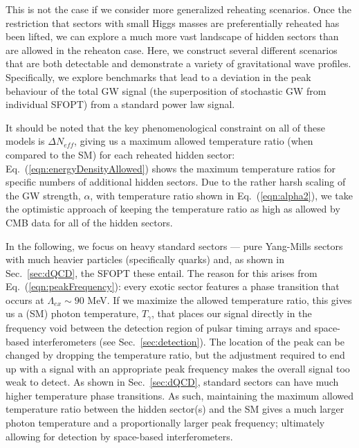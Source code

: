 \documentclass[nofootinbib,twocolumn,preprintnumbers]{revtex4-1}
\begin{document}
This is not the case if we consider more generalized reheating scenarios. Once the restriction that sectors with small Higgs masses are preferentially reheated has been lifted, we can explore a much more vast landscape of hidden sectors than are allowed in the reheaton case. Here, we construct several different scenarios that are both detectable and demonstrate a variety of gravitational wave profiles. Specifically, we explore benchmarks that lead to a deviation in the peak behaviour of the total GW signal (the superposition of stochastic GW from individual SFOPT) from a standard power law signal.

It should be noted that the key phenomenological constraint on all of these models is $\Delta N_{eff}$, giving us a maximum allowed temperature ratio (when compared to the SM) for each reheated hidden sector: Eq.~(\ref{eqn:energyDensityAllowed}) shows the maximum temperature ratios for specific numbers of additional hidden sectors. Due to the rather harsh scaling of the GW strength, $\alpha$, with temperature ratio shown in Eq.~(\ref{eqn:alpha2}), we take the optimistic approach of keeping the temperature ratio as high as allowed by CMB data for all of the hidden sectors.

In the following, we focus on heavy standard sectors --- pure Yang-Mills sectors with much heavier particles (specifically quarks) and, as shown in Sec.~\ref{sec:dQCD}, the SFOPT these entail. The reason for this arises from Eq.~(\ref{eqn:peakFrequency}): every exotic sector features a phase transition that occurs at $\Lambda_{ex} \sim 90$ MeV. If we maximize the allowed temperature ratio, this gives us a (SM) photon temperature, $T_{\gamma}$, that places our signal directly in the frequency void between the detection region of pulsar timing arrays and space-based interferometers (see Sec.~\ref{sec:detection}). The location of the peak can be changed by dropping the temperature ratio, but the adjustment required to end up with a signal with an appropriate peak frequency makes the overall signal too weak to detect. As shown in Sec.~\ref{sec:dQCD}, standard sectors can have much higher temperature phase transitions. As such, maintaining the maximum allowed temperature ratio between the hidden sector(s) and the SM gives a much larger photon temperature and a proportionally larger peak frequency; ultimately allowing for detection by space-based interferometers. 
\end{document}
